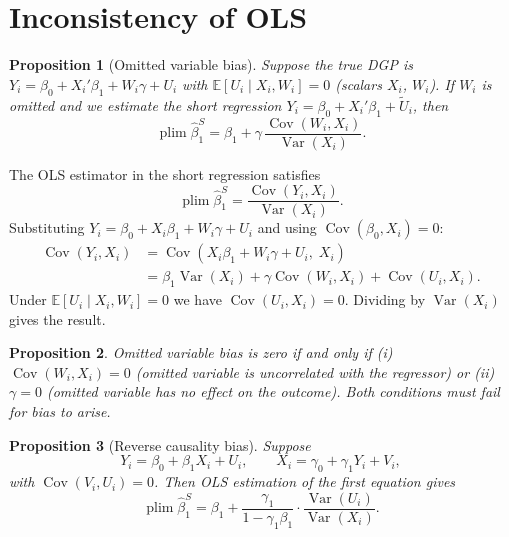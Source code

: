 \documentclass[12pt,a4paper]{article}
\theoremstyle{plain}
\newtheorem{propositio}{Proposition}[section]
\theoremstyle{definition}
\renewenvironment{proof}{\pushQED{\qed}\normalfont}{\popQED\par\nobreak}
\newcommand{\E}{\mathbb{E}}
\newcommand{\Cov}{\operatorname{Cov}}
\newcommand{\Var}{\operatorname{Var}}
\newcommand{\plim}{\operatorname{plim}}
\begin{document}
\section{Inconsistency of OLS}

\begin{propositio}[Omitted variable bias\label{prop:ovb}]
Suppose the true DGP is $Y_i = \beta_0 + X_i'\beta_1 + W_i\gamma + U_i$ with $\E[U_i\mid X_i,W_i]=0$ (scalars $X_i$, $W_i$).
If $W_i$ is omitted and we estimate the short regression $Y_i = \beta_0 + X_i'\beta_1 + \tilde U_i$, then
\[
  \plim\hat\beta_1^S = \beta_1 + \gamma\,\frac{\Cov(W_i,X_i)}{\Var(X_i)}.
\]
\end{propositio}

\begin{proof}
The OLS estimator in the short regression satisfies
\[
  \plim\hat\beta_1^S = \frac{\Cov(Y_i,X_i)}{\Var(X_i)}.
\]
Substituting $Y_i = \beta_0 + X_i\beta_1 + W_i\gamma + U_i$ and using $\Cov(\beta_0,X_i)=0$:
\begin{align*}
  \Cov(Y_i,X_i)
  &= \Cov(X_i\beta_1 + W_i\gamma + U_i,\; X_i)\\
  &= \beta_1\Var(X_i) + \gamma\Cov(W_i,X_i) + \Cov(U_i,X_i).
\end{align*}
Under $\E[U_i\mid X_i,W_i]=0$ we have $\Cov(U_i,X_i)=0$.  Dividing by $\Var(X_i)$ gives the result.
\end{proof}

\begin{propositio}
  Omitted variable bias is zero if and only if (i) $\Cov(W_i,X_i)=0$ (omitted variable is uncorrelated with the regressor) or (ii) $\gamma=0$ (omitted variable has no effect on the outcome).  Both conditions must fail for bias to arise.
\end{propositio}

\begin{propositio}[Reverse causality bias\label{prop:reversecausality}]
Suppose
\[
  Y_i = \beta_0 + \beta_1 X_i + U_i, \qquad
  X_i = \gamma_0 + \gamma_1 Y_i + V_i,
\]
with $\Cov(V_i,U_i)=0$.  Then OLS estimation of the first equation gives
\[
  \plim\hat\beta_1^S
  = \beta_1 + \frac{\gamma_1}{1-\gamma_1\beta_1}\cdot\frac{\Var(U_i)}{\Var(X_i)}.
\]
\end{propositio}
\end{document}
